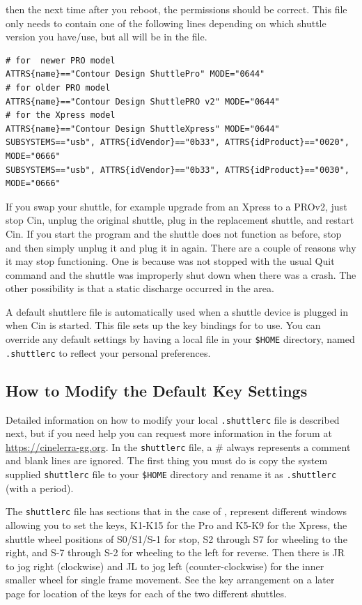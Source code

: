 then the next time after you reboot, the permissions should be
correct. This file only needs to contain one of the following lines
depending on which shuttle version you have/use, but all will be in
the file.

\begin{lstlisting}[style=sh]
# for  newer PRO model
ATTRS{name}=="Contour Design ShuttlePro" MODE="0644"
# for older PRO model
ATTRS{name}=="Contour Design ShuttlePRO v2" MODE="0644"
# for the Xpress model
ATTRS{name}=="Contour Design ShuttleXpress" MODE="0644"
SUBSYSTEMS=="usb", ATTRS{idVendor}=="0b33", ATTRS{idProduct}=="0020", MODE="0666"
SUBSYSTEMS=="usb", ATTRS{idVendor}=="0b33", ATTRS{idProduct}=="0030", MODE="0666"
\end{lstlisting}

If you swap your shuttle, for example upgrade from an Xpress to a
PROv2, just stop Cin, unplug the original shuttle, plug in the
replacement shuttle, and restart Cin.  If you start the \CGG{}
program and the shuttle does not function as before, stop \CGG{} and
then simply unplug it and plug it in again.  There are a couple of
reasons why it may stop functioning.  One is because \CGG{} was not
stopped with the usual Quit command and the shuttle was improperly
shut down when there was a crash.  The other possibility is that a
static discharge occurred in the area.

A default shuttlerc file is automatically used when a shuttle device
is plugged in when Cin is started. This file sets up the key
bindings for \CGG{} to use. You can override any default settings by
having a local file in your \texttt{\$HOME} directory, named
\texttt{.shuttlerc} to reflect your personal preferences.


\subsection{How to Modify the Default Key Settings}%
\label{sub:modify_default_key_settings}

Detailed information on how to modify your local \texttt{.shuttlerc}
file is described next, but if you need help you can request more
information in the forum at {\small
  \url{https://cinelerra-gg.org}}. In the \texttt{shuttlerc} file, a
\# always represents a comment and blank lines are ignored.  The
first thing you must do is copy the system supplied
\texttt{shuttlerc} file to your \texttt{\$HOME} directory and rename
it as \texttt{.shuttlerc} (with a period).

The \texttt{shuttlerc} file has sections that in the case of \CGG{},
represent different windows allowing you to set the keys, K1-K15 for
the Pro and K5-K9 for the Xpress, the shuttle wheel positions of
S0/S1/S-1 for stop, S2 through S7 for wheeling to the right, and S-7
through S-2 for wheeling to the left for reverse.  Then there is JR
to jog right (clockwise) and JL to jog left (counter-clockwise) for
the inner smaller wheel for single frame movement.  See the key
arrangement on a later page for location of the keys for each of the
two different shuttles.

